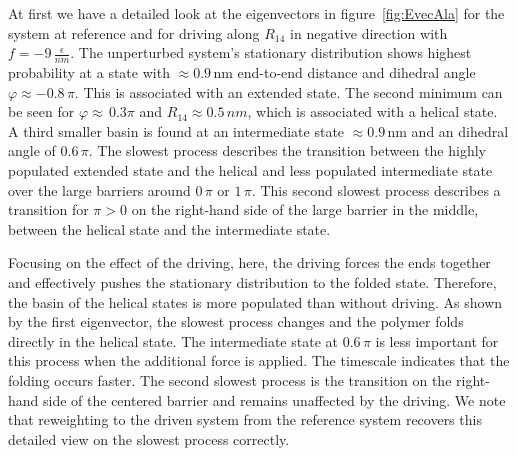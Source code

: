 At first we have a detailed look at the eigenvectors in figure~\ref{fig:EvecAla} for the system at reference and for driving along $R_{14}$ in negative direction with $f=-9\,\frac{\epsilon}{nm}$. The unperturbed system's stationary distribution shows highest probability at a state with $ \approx 0.9\,$nm end-to-end distance and dihedral angle $\varphi \approx -0.8\,\pi$. This is associated with an extended state. The second minimum can be seen for $\varphi \approx\,0.3 \pi$ and $R_{14} \approx 0.5\,nm$, which is associated with a helical state. A third smaller basin is found at an intermediate state $ \approx 0.9\,$nm and an dihedral angle of $ 0.6\,\pi$. The slowest process describes the transition between the highly populated extended state and the helical and less populated intermediate state over the large barriers around $0\,\pi$ or $1\,\pi$. This second slowest process describes a transition for $\pi>0$ on the right-hand side of the large barrier in the middle, between the helical state and the intermediate state. 


Focusing on the effect of the driving, here, the driving forces the ends together and effectively pushes the stationary distribution to the folded state.  Therefore, the basin of the helical states is more populated than without driving. As shown by the first eigenvector, the slowest process changes and the polymer folds directly in the helical state.  The intermediate state at $0.6\,\pi$ is less important for this process when the additional force is applied. The timescale indicates that the folding occurs faster. The second slowest process is the transition on the right-hand side of the centered barrier and remains unaffected by the driving. We note that 
reweighting to the driven system from the reference system recovers this detailed view on the slowest process correctly.


